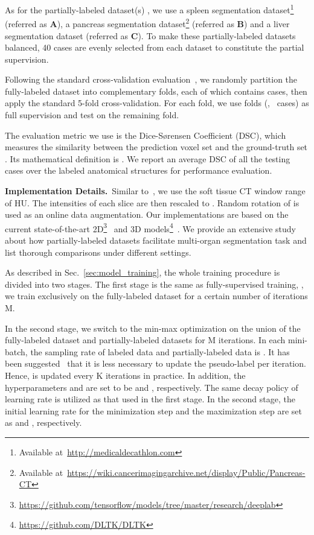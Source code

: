 \documentclass[10pt,twocolumn,letterpaper]{article}
\begin{document}
As for the partially-labeled dataset(s) , we use a spleen segmentation dataset\footnote{Available at~\url{http://medicaldecathlon.com}} (referred as \textbf{A}), a pancreas segmentation dataset\footnote{Available at~\url{https://wiki.cancerimagingarchive.net/display/Public/Pancreas-CT}} (referred as \textbf{B}) and a liver segmentation dataset\textcolor{red}{} (referred as \textbf{C}). To make these partially-labeled datasets balanced, 40 cases are evenly selected from each dataset to constitute the partial supervision.

Following the standard cross-validation evaluation~\cite{roth2018multi, roth2018spatial, nogues2016automatic, zhou2017fixed, wang2018training}, we randomly partition the fully-labeled dataset  into  complementary folds, each of which contains  cases, then apply the standard 5-fold cross-validation. For each fold, we use  folds (\ie,~ cases) as full supervision and test on the remaining fold. 

The evaluation metric we use is the Dice-S{\o}rensen Coefficient (DSC), which measures the similarity between the prediction voxel set  and the ground-truth set . Its mathematical definition is  .
We report an average DSC of all the testing cases over the  labeled anatomical structures for performance evaluation. 




\vspace{1ex}\noindent\textbf{Implementation Details.}~Similar to~\cite{zhou2017fixed, roth2018spatial, roth2018multi, wang2018training}, we use the soft tissue CT window range of  HU. The intensities of each slice are then rescaled to . Random rotation of  is used as an online data augmentation. Our implementations are based on the current state-of-the-art 2D\footnote{\url{https://github.com/tensorflow/models/tree/master/research/deeplab}}~\cite{chen2018encoder, chen2018deeplab} and 3D models\footnote{\url{https://github.com/DLTK/DLTK}}~\cite{ronneberger2015u,pawlowski2017dltk}. We provide an extensive study about how partially-labeled datasets facilitate multi-organ segmentation task and list thorough comparisons under different settings. 

As described in Sec.~\ref{sec:model_training}, the whole training procedure is divided into two stages. The first stage is the same as fully-supervised training, \ie, we train exclusively on the fully-labeled dataset  for a certain number of iterations M.
 
In the second stage, we switch to the min-max optimization on the union of the fully-labeled dataset and partially-labeled datasets for M iterations. 
In each mini-batch, the sampling rate of labeled data and partially-labeled data is . It has been suggested~\cite{bai2017semi} that it is less necessary to update the pseudo-label  per iteration. Hence,  is updated every K iterations in practice. In addition, the hyperparameters  and  are set to be  and , respectively. 
The same decay policy of learning rate is utilized as that used in the first stage. In the second stage, the initial learning rate for the minimization step and the maximization step are set as  and , respectively. 
\end{document}
